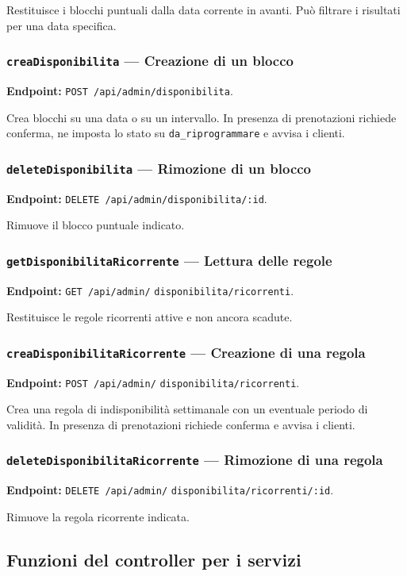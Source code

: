 \documentclass[12pt,a4paper]{article}
\begin{document}
Restituisce i blocchi puntuali dalla data corrente in avanti. Può filtrare i
risultati per una data specifica.

\subsubsection{\texttt{creaDisponibilita} --- Creazione di un blocco}
\textbf{Endpoint:} \texttt{POST /api/admin/disponibilita}.

Crea blocchi su una data o su un intervallo. In presenza di prenotazioni
richiede conferma, ne imposta lo stato su \texttt{da\_riprogrammare} e avvisa
i clienti.

\subsubsection{\texttt{deleteDisponibilita} --- Rimozione di un blocco}
\textbf{Endpoint:} \texttt{DELETE /api/admin/disponibilita/:id}.

Rimuove il blocco puntuale indicato.

\subsubsection{\texttt{getDisponibilitaRicorrente} --- Lettura delle regole}
\textbf{Endpoint:} \texttt{GET /api/admin/}\allowbreak
\texttt{disponibilita/ricorrenti}.

Restituisce le regole ricorrenti attive e non ancora scadute.

\subsubsection{\texttt{creaDisponibilitaRicorrente} --- Creazione di una regola}
\textbf{Endpoint:} \texttt{POST /api/admin/}\allowbreak
\texttt{disponibilita/ricorrenti}.

Crea una regola di indisponibilità settimanale con un eventuale periodo di
validità. In presenza di prenotazioni richiede conferma e avvisa i clienti.

\subsubsection{\texttt{deleteDisponibilitaRicorrente} --- Rimozione di una regola}
\textbf{Endpoint:} \texttt{DELETE /api/admin/}\allowbreak
\texttt{disponibilita/ricorrenti/:id}.

Rimuove la regola ricorrente indicata.

\subsection{Funzioni del controller per i servizi}
\end{document}
